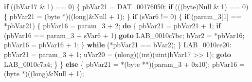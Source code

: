 \documentclass[
]{article}
\newenvironment{Shaded}{}{}
\newcommand{\BaseNTok}[1]{\textcolor[rgb]{0.25,0.63,0.44}{#1}}
\newcommand{\ControlFlowTok}[1]{\textcolor[rgb]{0.00,0.44,0.13}{\textbf{#1}}}
\newcommand{\DataTypeTok}[1]{\textcolor[rgb]{0.56,0.13,0.00}{#1}}
\newcommand{\DecValTok}[1]{\textcolor[rgb]{0.25,0.63,0.44}{#1}}
\newcommand{\ExtensionTok}[1]{#1}
\newcommand{\NormalTok}[1]{#1}
\newcommand{\OperatorTok}[1]{\textcolor[rgb]{0.40,0.40,0.40}{#1}}
\begin{document}
\begin{Shaded}
\begin{Highlighting}[]
    \ControlFlowTok{if} \OperatorTok{((}\NormalTok{bVar17 }\OperatorTok{\&} \DecValTok{1}\OperatorTok{)} \OperatorTok{==} \DecValTok{0}\OperatorTok{)} \OperatorTok{\{}
\NormalTok{      pbVar21 }\OperatorTok{=}\NormalTok{ DAT\_00176050}\OperatorTok{;}
      \ControlFlowTok{if} \OperatorTok{(((}\NormalTok{byte}\OperatorTok{)}\NormalTok{Null }\OperatorTok{\&} \DecValTok{1}\OperatorTok{)} \OperatorTok{==} \DecValTok{0}\OperatorTok{)} \OperatorTok{\{}
\NormalTok{        pbVar21 }\OperatorTok{=} \OperatorTok{(}\NormalTok{byte }\OperatorTok{*)((}\DataTypeTok{long}\OperatorTok{)\&}\NormalTok{Null }\OperatorTok{+} \DecValTok{1}\OperatorTok{);}
      \OperatorTok{\}}
      \ControlFlowTok{if} \OperatorTok{(}\NormalTok{sVar6 }\OperatorTok{!=} \DecValTok{0}\OperatorTok{)} \OperatorTok{\{}
        \ControlFlowTok{if} \OperatorTok{(}\NormalTok{param\_3}\OperatorTok{[}\DecValTok{1}\OperatorTok{]} \OperatorTok{==} \OperatorTok{*}\NormalTok{pbVar21}\OperatorTok{)} \OperatorTok{\{}
\NormalTok{          pbVar16 }\OperatorTok{=}\NormalTok{ param\_3 }\OperatorTok{+} \DecValTok{2}\OperatorTok{;}
          \ControlFlowTok{do} \OperatorTok{\{}
\NormalTok{            pbVar21 }\OperatorTok{=}\NormalTok{ pbVar21 }\OperatorTok{+} \DecValTok{1}\OperatorTok{;}
            \ControlFlowTok{if} \OperatorTok{(}\NormalTok{pbVar16 }\OperatorTok{==}\NormalTok{ param\_3 }\OperatorTok{+}\NormalTok{ sVar6 }\OperatorTok{+} \DecValTok{1}\OperatorTok{)} \ControlFlowTok{goto}\NormalTok{ LAB\_0010c7bc}\OperatorTok{;}
\NormalTok{            bVar2 }\OperatorTok{=} \OperatorTok{*}\NormalTok{pbVar16}\OperatorTok{;}
\NormalTok{            pbVar16 }\OperatorTok{=}\NormalTok{ pbVar16 }\OperatorTok{+} \DecValTok{1}\OperatorTok{;}
          \OperatorTok{\}} \ControlFlowTok{while} \OperatorTok{(*}\NormalTok{pbVar21 }\OperatorTok{==}\NormalTok{ bVar2}\OperatorTok{);}
        \OperatorTok{\}}
\NormalTok{LAB\_0010ce20}\OperatorTok{:}
\NormalTok{        pbVar21 }\OperatorTok{=}\NormalTok{ param\_3 }\OperatorTok{+} \DecValTok{1}\OperatorTok{;}
\NormalTok{        uVar20 }\OperatorTok{=} \OperatorTok{(}\ExtensionTok{ulong}\OperatorTok{)((}\DataTypeTok{int}\OperatorTok{)(}\ExtensionTok{uint}\OperatorTok{)}\NormalTok{bVar17 }\OperatorTok{\textgreater{}\textgreater{}} \DecValTok{1}\OperatorTok{);}
        \ControlFlowTok{goto}\NormalTok{ LAB\_0010c7a4}\OperatorTok{;}
      \OperatorTok{\}}
    \OperatorTok{\}}
    \ControlFlowTok{else} \OperatorTok{\{}
\NormalTok{      pbVar21 }\OperatorTok{=} \OperatorTok{*(}\NormalTok{byte }\OperatorTok{**)(}\NormalTok{param\_3 }\OperatorTok{+} \BaseNTok{0x10}\OperatorTok{);}
\NormalTok{      pbVar16 }\OperatorTok{=} \OperatorTok{(}\NormalTok{byte }\OperatorTok{*)((}\DataTypeTok{long}\OperatorTok{)\&}\NormalTok{Null }\OperatorTok{+} \DecValTok{1}\OperatorTok{);}

\end{Highlighting}
\end{Shaded}
\end{document}
